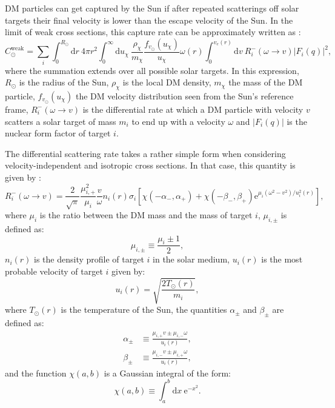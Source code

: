 DM particles can get captured by the Sun if after repeated scatterings off solar targets their final velocity is lower than the escape velocity of the Sun. In the limit of weak cross sections, this capture rate can be approximately written as \cite{Gould1987}:
\begin{equation}\label{2.5}
	C_{\odot}^{\mathrm{weak}} = \sum_{i} \int_{0}^{R_{\odot}} \mathrm{d}r \ 4\pi r^{2} \int_{0}^{\infty} \mathrm{d}u_{\chi} \ \frac{\rho_{\chi}}{m_{\chi}} \frac{f_{v_{\odot}}(u_{\chi})}{u_{\chi}} \omega(r) \int_{0}^{v_{e}(r)} \mathrm{d}v \ R_{i}^{-}(\omega \rightarrow v) |F_{i}(q)|^{2},
\end{equation}
where the summation extends over all possible solar targets. In this expression, $R_{\odot}$ is the radius of the Sun, $\rho_{\chi}$ is the local DM density, $m_{\chi}$ the mass of the DM particle, $f_{v_{\odot}}(u_{\chi})$ the DM velocity distribution seen from the Sun's reference frame, $R_{i}^{-}(\omega \rightarrow v)$ is the differential rate at which a DM particle with velocity $v$ scatters a solar target of mass $m_{i}$ to end up with a velocity $\omega$ and $|F_{i}(q)|$ is the nuclear form factor of target $i$.

The differential scattering rate takes a rather simple form when considering velocity-independent and isotropic cross sections. In that case, this quantity is given by \cite{Gould1987, Palomares2017}:
\begin{equation}\label{2.6}
	R_{i}^{-}(\omega \rightarrow v) = \frac{2}{\sqrt{\pi}} \frac{\mu_{i,+}^{2}}{\mu_{i}} \frac{v}{\omega} n_{i}(r) \sigma_{i} \left[\chi(- \alpha_{-}, \alpha_{+})+\chi(- \beta_{-}, \beta_{+}) \mathrm{e}^{\mu_{i}(\omega^{2}-v^{2})/u_{i}^{2}(r)}\right],
\end{equation}
where $\mu_{i}$ is the ratio between the DM mass and the mass of target $i$, $\mu_{i,\pm}$ is defined as:
\begin{equation}\label{2.7}
	\mu_{i,\pm} \equiv \frac{\mu_{i} \pm 1}{2},
\end{equation}
$n_{i}(r)$ is the density profile of target $i$ in the solar medium, $u_{i}(r)$ is the most probable velocity of target $i$ given by:
\begin{equation}\label{2.8}
	u_{i}(r) = \sqrt{\frac{2 T_{\odot}(r)}{m_{i}}},
\end{equation}
where $T_{\odot}(r)$ is the temperature of the Sun, the quantities $\alpha_{\pm}$ and $\beta_{\pm}$ are defined as:
\begin{align}\label{2.9-2.10}
	\alpha_{\pm} &\equiv \frac{\mu_{i,+} v \pm \mu_{i,-} \omega}{u_{i}(r)},\\
	\beta_{\pm} &\equiv \frac{\mu_{i,-} v \pm \mu_{i,+} \omega}{u_{i}(r)},
\end{align}
and the function $\chi(a,b)$ is a Gaussian integral of the form:
\begin{equation}\label{2.11}
	\chi(a,b) \equiv \int_{a}^{b} \mathrm{d}x \ \mathrm{e}^{-x^{2}}. 
\end{equation}

